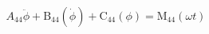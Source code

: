 \begin{equation}
A_{44} \ddot{\phi} + \operatorname{B_{44}}\left(\dot{\phi}\right) + \operatorname{C_{44}}\left(\phi\right) = \operatorname{M_{44}}\left(\omega t\right)
\end{equation}
